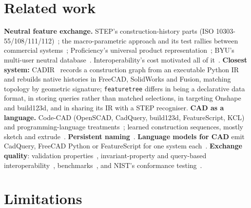 \documentclass[11pt]{article}
\newcommand{\code}[1]{\texttt{\small #1}}
\begin{document}
\section{Related work}\label{sec:related}

\textbf{Neutral feature exchange.} STEP's construction-history parts
(ISO 10303-55/108/111/112)~\cite{TODO-pratt-kim,kim2008designintent,kim2011procedural2d};
the macro-parametric approach and its test rallies between commercial
systems~\cite{TODO-mun-han,safdar2020macroparametric,kim2019assembly};
Proficiency's universal product representation~\cite{TODO-rappoport}; BYU's
multi-user neutral database~\cite{TODO-shumway}. Interoperability's cost motivated
all of it~\cite{brunnermeier2002interop}. \textbf{Closest system:}
CADIR~\cite{liu2026cadir} records a construction graph from an executable Python
IR and rebuilds native histories in FreeCAD, SolidWorks and Fusion, matching
topology by geometric signature; \code{featuretree} differs in being a
declarative data format, in storing queries rather than matched selections, in
targeting Onshape and build123d, and in sharing its IR with a STEP recogniser.
\textbf{CAD as a language.} Code-CAD (OpenSCAD, CadQuery, build123d,
FeatureScript, KCL)~\cite{machado2019openscad} and programming-language
treatments~\cite{nandi2018functional,nandi2020szalinski,TODO-cascaval,ritchie2023neurosymbolic};
learned construction sequences, mostly sketch and extrude~\cite{seff2020sketchgraphs,wu2021deepcad,xu2022skexgen,TODO-willis-fusion,khan2024text2cad,rukhovich2025cadrecode}.
\textbf{Persistent naming}~\cite{capoyleas1996generic,kripac1997mechanism,bidarra2002persistent,marcheix2002survey,wang2005geometry,farjana2018mechanisms}.
\textbf{Language models for CAD} emit CadQuery, FreeCAD Python or FeatureScript
for one system each~\cite{makatura2023llmdesign,alrashedy2025cadcodeverify,pyatov2026cadfs,hepworth2026iterative,mallis2025cadassistant}.
\textbf{Exchange quality}: validation properties~\cite{caxif_gvp_2014},
invariant-property and query-based interoperability~\cite{hoffmann2014queries,sap2019invariant,sap2025interop},
benchmarks~\cite{gerbino2004interop}, and NIST's conformance
testing~\cite{lipman2017nistpmi,lipman2020gdt}.

\section{Limitations}
\end{document}
